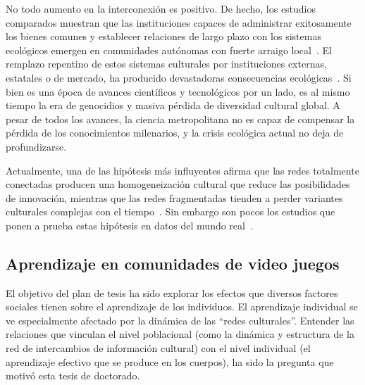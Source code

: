\documentclass[a4paper,11pt]{book}
\theoremstyle{definition}
\begin{document}

No todo aumento en la interconexi\'on es positivo.
%
De hecho, los estudios comparados muestran que las instituciones capaces de administrar exitosamente los bienes comunes y establecer relaciones de largo plazo con los sistemas ecol\'ogicos emergen en comunidades aut\'onomas con fuerte arraigo local~\cite{ostrom2010, ostrom1990}.
%
El remplazo repentino de estos sistemas culturales por instituciones externas, estatales o de mercado, ha producido devastadoras consecuencias ecol\'ogicas~\cite{segato2013-colonialidad}.
%
Si bien es una \'epoca de avances cient\'ificos y tecnol\'ogicos por un lado, es al mismo tiempo la era de genocidios y masiva p\'erdida de diversidad cultural global.
%
A pesar de todos los avances, la ciencia metropolitana no es capaz de compensar la p\'erdida de los conocimientos milenarios, y la crisis ecol\'ogica actual no deja de profundizarse.


Actualmente, una de las hip\'otesis m\'as influyentes afirma que las redes totalmente conectadas producen una homogeneizaci\'on cultural que reduce las posibilidades de innovaci\'on, mientras que las redes fragmentadas tienden a perder variantes culturales complejas con el tiempo~\cite{padilla2022-interconnectivity,Derex2018a,Creanza2017}.
%
Sin embargo son pocos los estudios que ponen a prueba estas hip\'otesis en datos del mundo real~\cite{migliano2017-hunterGathererNetwork, Derex2020}.


\subsection{Aprendizaje en comunidades de video juegos}


El objetivo del plan de tesis ha sido explorar los efectos que diversos factores sociales tienen sobre el aprendizaje de los individuos.
%
El aprendizaje individual se ve especialmente afectado por la din\'amica de las ``redes culturales''.
%
Entender las relaciones que vinculan el nivel poblacional (como la din\'amica y estructura de la red de intercambios de informaci\'on cultural) con el nivel individual (el aprendizaje efectivo que se produce
en los cuerpos), ha sido la pregunta que motiv\'o esta tesis de doctorado.
\end{document}
